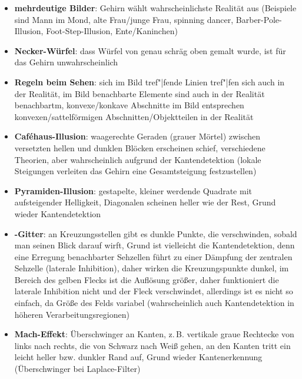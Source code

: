\linie
\pagebreak
\begin{itemize}
    \item
    \textbf{mehrdeutige Bilder}:
    Gehirn wählt wahrscheinlichste Realität aus
    (Beispiele sind Mann im Mond, alte Frau/junge Frau, spinning dancer,
    Barber-Pole-Illusion, Foot-Step-Illusion, Ente/Kaninchen)

    \item
    \textbf{Necker-Würfel}:
    dass Würfel von genau schräg oben gemalt wurde, ist für das
    Gehirn unwahrscheinlich

    \item
    \textbf{Regeln beim Sehen}:
    sich im Bild tref"|fende Linien tref"|fen sich auch in der Realität,
    im Bild benachbarte Elemente sind auch in der Realität benachbartm,
    konvexe/konkave Abschnitte im Bild entsprechen konvexen/sattelförmigen
    Abschnitten/Objektteilen in der Realität
\end{itemize}
\linie
\begin{itemize}
    \item
    \textbf{Caféhaus-Illusion}:
    waagerechte Geraden (grauer Mörtel) zwischen versetzten hellen und dunklen
    Blöcken erscheinen schief, verschiedene Theorien,
    aber wahrscheinlich aufgrund der Kantendetektion
    (lokale Steigungen verleiten das Gehirn eine Gesamtsteigung festzustellen)

    \item
    \textbf{Pyramiden-Illusion}:
    gestapelte, kleiner werdende Quadrate mit aufsteigender Helligkeit,
    Diagonalen scheinen heller wie der Rest,
    Grund wieder Kantendetektion
\end{itemize}
\linie
\begin{itemize}
    \item
    \textbf{-Gitter}:
    an Kreuzungsstellen gibt es dunkle Punkte, die verschwinden, sobald man
    seinen Blick darauf wirft,
    Grund ist vielleicht die Kantendetektion,
    denn eine Erregung benachbarter Sehzellen führt zu einer Dämpfung
    der zentralen Sehzelle (laterale Inhibition), daher wirken die
    Kreuzungspunkte dunkel,
    im Bereich des gelben Flecks ist die Auflösung größer, daher funktioniert
    die laterale Inhibition nicht und der Fleck verschwindet,
    allerdings ist es nicht so einfach, da Größe des Felds variabel
    (wahrscheinlich auch Kantendetektion in höheren Verarbeitungsregionen)

    \item
    \textbf{Mach-Effekt}:
    Überschwinger an Kanten,
    z.\,B. vertikale graue Rechtecke von links nach rechts, die
    von Schwarz nach Weiß gehen,
    an den Kanten tritt ein leicht heller bzw. dunkler Rand auf,
    Grund wieder Kantenerkennung
    (Überschwinger bei Laplace-Filter)
\end{itemize}
